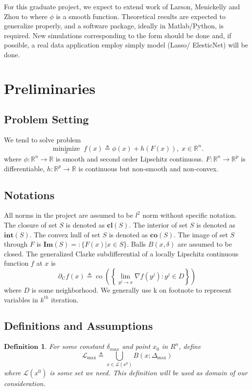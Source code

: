 \documentclass[10pt, oneside]{article}
\newtheorem{defn}[thm]{$\mathbf{Definition}$}
\begin{document}
For this graduate project, we expect to extend work of Larson, Menickelly and Zhou \cite{manifold} to where $\phi$ is a smooth function. Theoretical results are expected to generalize properly, and a software package, ideally in Matlab/Python, is required. New simulations corresponding to the form should be done and, if possible, a real data application employ simply model (Lasso/ ElesticNet) will be done. 

\section{Preliminaries}

\subsection{Problem Setting}

We tend to solve problem 
$$
\underset{x}{\operatorname{minimize}} \; f(x) \triangleq \phi(x)+h(F(x)),  \; x \in \mathbb{R}^n. 
$$
where $\phi: \mathbb{R}^n\rightarrow \mathbb{R}$ is smooth and second order Lipschitz continuous. $F: \mathbb{R}^{n} \rightarrow \mathbb{R}^{p}$ is differentiable, $h: \mathbb{R}^{p} \rightarrow \mathbb{R}$ is continuous but non-smooth and non-convex. 


\subsection{Notations}

All norms in the project are assumed to be $l^2$ norm without specific notation. The closure of set $S$ is denoted as $\mathbf{cl}(S)$. The interior of set $S$ is denoted as $\mathbf{int}(S)$. The convex hull of set $S$ is denoted as $\mathbf{co}(S)$. The image of set $S$ through $F$ is $\mathbf{Im}(S)=:\{F(x)|x\in S\}$. Balls $B(x,\delta)$ are assumed to be closed. 
The generalized Clarke subdifferential of a locally Lipschitz continuous function $f$ at $x$ is 
$$
\partial_{\mathrm{C}} f(x) \triangleq \operatorname{co}\left(\left\{\lim _{y^{j} \rightarrow x} \nabla f\left(y^{j}\right): y^{j} \in D\right\}\right)
$$
where $D$ is some neighborhood. We generally use k on footnote to represent variables in $k^{th}$ iteration. 

\subsection{Definitions and Assumptions}

\begin{defn}
For some constant $\delta_{max}$ and point $x_0$ in $R^n$, define
$$
\mathcal{L}_{\max } \triangleq \bigcup_{x \in \mathcal{L}\left(x^{0}\right)} B \left(x ; \Delta_{\max }\right)
$$
where $\mathcal{L}\left(x^{0}\right)$ is some set we need. This definition will be used as domain of our consideration. 
\end{defn}
\end{document}
